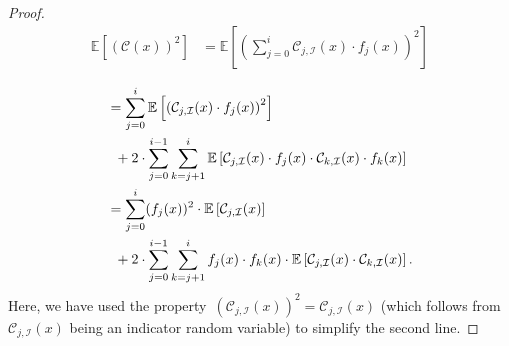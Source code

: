 \documentclass[sigconf]{acmart}
\newcommand{\parentheses}[1]{\left(#1\right)}
\newcommand{\expectation}[1]{\mathbb{E}\left[ #1 \right]}
\begin{document}
\begin{proof}
    \begin{align*}
        \expectation{\parentheses{\mathcal{C}(x)}^2} &= \expectation{\parentheses{ \sum_{j=0}^i \mathcal{C}_{j,\mathcal{I}}(x) \cdot f_j(x) }^2}\\
    \end{align*}
    \begin{align}
        & = \sum_{j=0}^i \expectation{ \parentheses{ \mathcal{C}_{j,\mathcal{I}}(x) \cdot f_j(x) }^2} \notag \\
        & \;\; + 2\cdot \sum_{j=0}^{i-1}  \sum_{k=j+1}^i   \expectation{ \mathcal{C}_{j,\mathcal{I}}(x) \cdot f_j(x) \cdot  \mathcal{C}_{k,\mathcal{I}}(x) \cdot f_k(x) } \notag \\
        & = \sum_{j=0}^i (f_j(x))^2 \cdot \expectation{ \mathcal{C}_{j,\mathcal{I}}(x)} \notag \\
        & \;\; +  2\cdot \sum_{j=0}^{i-1}  \sum_{k=j+1}^i   f_j(x)  \cdot f_k(x) \cdot   \expectation{ \mathcal{C}_{j,\mathcal{I}}(x) \cdot   \mathcal{C}_{k,\mathcal{I}}(x) }. \label{eq:sketchcs_var}
    \end{align}
    Here, we have used the property~$(\mathcal{C}_{j,\mathcal{I}}(x))^2 =
    \mathcal{C}_{j,\mathcal{I}}(x)$ (which follows
    from~$\mathcal{C}_{j,\mathcal{I}}(x)$ being an indicator random variable)
    to simplify the second line. 


\end{proof}
\end{document}
